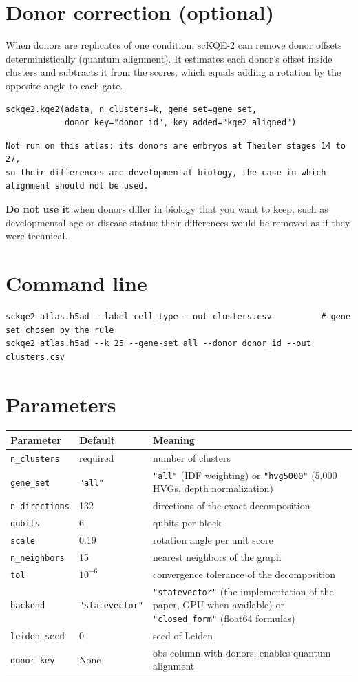 \documentclass[11pt]{article}
\begin{document}
\section{Donor correction (optional)}\label{sec:align}
When donors are replicates of one condition, scKQE-2 can remove donor offsets deterministically (quantum alignment). It estimates each donor's offset inside clusters and subtracts it from the scores, which equals adding a rotation by the opposite angle to each gate.
\begin{lstlisting}
sckqe2.kqe2(adata, n_clusters=k, gene_set=gene_set,
            donor_key="donor_id", key_added="kqe2_aligned")
\end{lstlisting}
\begin{lstlisting}[style=out]
Not run on this atlas: its donors are embryos at Theiler stages 14 to 27,
so their differences are developmental biology, the case in which
alignment should not be used.
\end{lstlisting}
\textbf{Do not use it} when donors differ in biology that you want to keep, such as developmental age or disease status: their differences would be removed as if they were technical.

\section{Command line}
\begin{lstlisting}[style=sh]
sckqe2 atlas.h5ad --label cell_type --out clusters.csv          # gene set chosen by the rule
sckqe2 atlas.h5ad --k 25 --gene-set all --donor donor_id --out clusters.csv
\end{lstlisting}

\section{Parameters}
\begin{tabular}{@{}L{3.1cm}L{2.6cm}L{9.6cm}@{}}
\toprule
Parameter & Default & Meaning\\
\midrule
\texttt{n\_clusters} & required & number of clusters\\
\texttt{gene\_set} & \texttt{"all"} & \texttt{"all"} (IDF weighting) or \texttt{"hvg5000"} (5,000 HVGs, depth normalization)\\
\texttt{n\_directions} & 132 & directions of the exact decomposition\\
\texttt{qubits} & 6 & qubits per block\\
\texttt{scale} & 0.19 & rotation angle per unit score\\
\texttt{n\_neighbors} & 15 & nearest neighbors of the graph\\
\texttt{tol} & $10^{-6}$ & convergence tolerance of the decomposition\\
\texttt{backend} & \texttt{"statevector"} & \texttt{"statevector"} (the implementation of the paper, GPU when available) or \texttt{"closed\_form"} (float64 formulas)\\
\texttt{leiden\_seed} & 0 & seed of Leiden\\
\texttt{donor\_key} & None & obs column with donors; enables quantum alignment\\
\bottomrule
\end{tabular}
\end{document}
